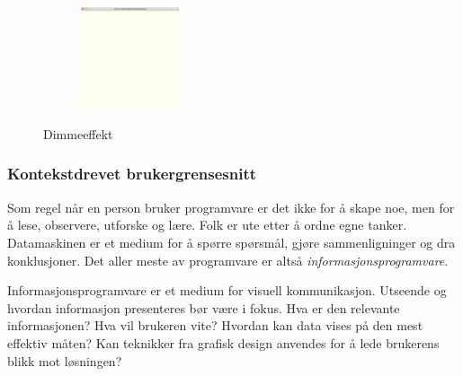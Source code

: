 \begin{figure}[h]
\begin{subfigure}{0.19\textwidth}
\caption{}
\label{fig:light-4}
\end{subfigure}
\begin{subfigure}{0.19\textwidth}
\includegraphics[width=3cm, height=3cm]{fig/light-5}
\caption{}
\label{fig:light-5}
\end{subfigure}
\caption{Dimmeeffekt}
\label{fig:light}
\end{figure}

\subsubsection*{Kontekstdrevet brukergrensesnitt}
Som regel når en person bruker programvare er det ikke for å skape noe, men for å lese, observere, utforske og lære. Folk er ute etter å ordne egne tanker. Datamaskinen er et medium for å spørre spørsmål, gjøre sammenligninger og dra konklusjoner. Det aller meste av programvare er altså \emph{informasjonsprogramvare}. 

Informasjonsprogramvare er et medium for visuell kommunikasjon. Utseende og hvordan informasjon presenteres bør være i fokus. Hva er den relevante informasjonen? Hva vil brukeren vite? Hvordan kan data vises på den mest effektiv måten? Kan teknikker fra grafisk design anvendes for å lede brukerens blikk mot løsningen?

